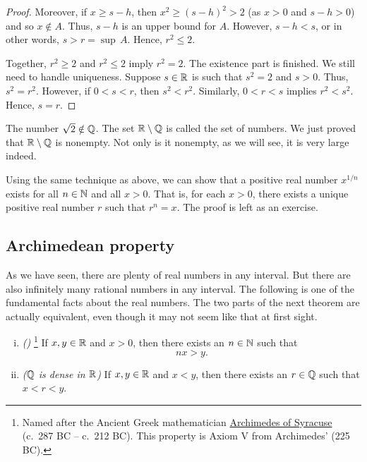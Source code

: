 \begin{example}
\begin{proof}
Moreover, if $x \geq s-h$,
then $x^2 \geq {(s-h)}^2 > 2$ (as $x > 0$ and $s-h > 0$) and so $x \notin A$.
Thus,
$s-h$ is an upper bound for $A$.  However, $s-h < s$, or in other
words, $s > r = \sup\, A$.  Hence, $r^2 \leq 2$.

\medskip

Together, $r^2 \geq 2$ and $r^2 \leq 2$ imply
$r^2 = 2$.  The existence part is finished.  We still need to
handle uniqueness.  Suppose $s \in {\mathbb{R}}$ is such that $s^2 = 2$ and $s > 0$.
Thus, $s^2 = r^2$.  However, if $0 < s < r$, then $s^2 < r^2$.  Similarly,
$0 < r < s$ implies $r^2 < s^2$.  Hence, $s = r$.
\end{proof}
\end{example}

The number $\sqrt{2} \notin {\mathbb{Q}}$.  The set
${\mathbb{R}} \setminus {\mathbb{Q}}$ is called the set of
\emph{} numbers.  We just proved that ${\mathbb{R}} \setminus {\mathbb{Q}}$
is nonempty.  Not only is it nonempty, as we will see, it is very
large indeed.

Using the same technique as above, we can show that a positive real
number $x^{1/n}$ exists for all $n\in {\mathbb{N}}$ and all $x > 0$.
That is, for each $x > 0$,
there exists a unique positive real number $r$ such that $r^n = x$.
The proof is left as an exercise.

\subsection{Archimedean property}

As we have seen, there are plenty of real numbers in any interval.  But
there are also infinitely many rational numbers in any interval.  The
following is one of the fundamental facts about the real numbers.
The two parts of the next theorem are actually equivalent, even though it may
not seem like that at first sight.


\begin{thm} \label{thm:arch}
\pagebreak[3]
\leavevmode
\begin{enumerate}[(i)]
\item \label{thm:arch:i} \emph{()}%
\footnote{Named after the Ancient Greek mathematician
\href{https://en.wikipedia.org/wiki/Archimedes}{Archimedes of Syracuse}
(c.\ 287 BC -- c.\ 212 BC)\@.
This property is Axiom V from Archimedes'  (225 BC)\@.}
If $x, y \in {\mathbb{R}}$ and
$x > 0$, then there exists an $n \in {\mathbb{N}}$ such that
\begin{equation*}
nx > y .
\end{equation*}
\item \label{thm:arch:ii} \emph{(${\mathbb{Q}}$ is dense in ${\mathbb{R}}$)} If $x, y \in {\mathbb{R}}$ and
$x < y$, then there exists an $r \in {\mathbb{Q}}$ such that
$x < r < y$.
\end{enumerate}
\end{thm}

